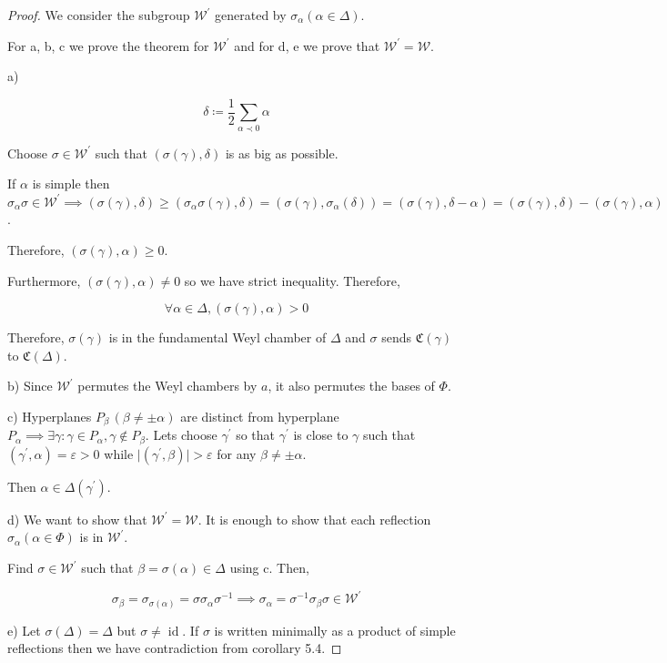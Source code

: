\documentclass{article}
\theoremstyle{definition}
\begin{document}
\begin{proof}
    We consider the subgroup \(\mathcal{W}^{\prime}\)  generated by \(\sigma_\alpha( \alpha \in \Delta)\).

    For a, b, c we prove the theorem for \(\mathcal{W}^{\prime}\) and for d, e we prove that \(\mathcal{W}^{\prime} = \mathcal{W}\).

    a)

    \[
        \delta \coloneqq \frac{1}{2} \sum_{\alpha \prec 0} \alpha 
    \]

    Choose \(\sigma \in \mathcal{W}^{\prime}\) such that \((\sigma(\gamma), \delta)\) is as big as possible.

    If \(\alpha\) is simple then \(\sigma_\alpha \sigma \in \mathcal{W} ^{\prime} \implies (\sigma(\gamma), \delta) \geq (\sigma_\alpha \sigma(\gamma),\delta) = (\sigma(\gamma), \sigma_\alpha(\delta))=(\sigma(\gamma), \delta -\alpha) = (\sigma(\gamma),\delta) - (\sigma(\gamma),\alpha)\).

    Therefore, \((\sigma(\gamma),\alpha)\geq 0\).

    Furthermore, \((\sigma(\gamma),\alpha)\neq 0\) so we have strict inequality. Therefore,

    \[
        \forall \alpha \in \Delta, (\sigma(\gamma), \alpha) > 0
    \]

    Therefore, \(\sigma(\gamma)\) is in the fundamental Weyl chamber of \(\Delta\) and \(\sigma\) sends \(\mathfrak{C}(\gamma)\) to \(\mathfrak{C}(\Delta)\).

    b) Since \(\mathcal{W}^{\prime}\) permutes the Weyl chambers by \(a\), it also permutes the bases of \(\Phi\).

    c) Hyperplanes \(P_\beta\, (\beta \neq \pm \alpha)\) are distinct from hyperplane \(P_\alpha \implies \exists \gamma: \gamma \in P_\alpha, \gamma \notin P_\beta\). Lets choose \(\gamma^{\prime}\) so that \(\gamma^{\prime}\) is close to \(\gamma\) such that \((\gamma ^{\prime} , \alpha) = \varepsilon > 0\) while \(\vert (\gamma^{\prime} , \beta) \vert > \varepsilon\) for any \(\beta \neq \pm \alpha\).

    Then \(\alpha \in \Delta(\gamma^{\prime})\).

    d) We want to show that \(\mathcal{W} ^{\prime} = \mathcal{W}\). It is enough to show that each reflection \(\sigma_\alpha(\alpha \in \Phi)\) is in \(\mathcal{W}^{\prime}\).
    
    Find \(\sigma \in \mathcal{W} ^{\prime} \) such that \(\beta = \sigma (\alpha)\in \Delta \) using c. Then,

    \[
        \sigma_\beta = \sigma_{\sigma(\alpha)} = \sigma \sigma_\alpha \sigma ^{-1} \implies \sigma_\alpha = \sigma ^{-1} \sigma _\beta \sigma \in \mathcal{W} ^{\prime} 
    \]

    e) Let \(\sigma(\Delta) = \Delta\) but \(\sigma \neq \operatorname{id}\). If \(\sigma\) is written minimally as a product of simple reflections then we have contradiction from corollary 5.4.

\end{proof}
\end{document}

